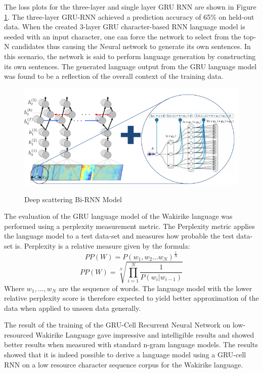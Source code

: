 The loss plots for the three-layer and single layer GRU RNN are shown in Figure \ref{fig_ch7_00losses}.  The three-layer GRU-RNN achieved a prediction accuracy of 65\% on held-out data.  When the created 3-layer GRU character-based RNN language model is seeded with an input character, one can force the network to select from the top-N candidates thus causing the Neural network to generate its own sentences.  In this scenario, the network is said to perform language generation by constructing its own sentences.  The generated language output from the GRU language model was found to be a reflection of the overall context of the training data. 

\begin{figure}
\centering
  \includegraphics[width=14cm]{thesis/images/ctc_scatter.png}\\
  \caption{Deep scattering Bi-RNN Model} \label{fig_ch7_00losses}
\end{figure}

The evaluation of the GRU language model of the Wakirike language was performed using a perplexity measurement metric. The Perplexity metric applies the language model to a test data-set and measures how probable the test data-set is. Perplexity is a relative measure given by the formula:
%
\begin{equation}
PP(W)=P(w_1,w_2\dots w_N)^\frac{1}{N}
\label{ch5_eq1_ppx}
\end{equation}
%
%
\begin{equation}
PP(W)=\sqrt[N]{\prod_{i=1}^N\frac{1}{P(w_i|w_{i-1})}}
\label{ch5_eq2_ppx}
\end{equation}
%
Where $w_1,\dots,w_N$ are the sequence of words. The language model with the lower relative perplexity score is therefore expected to yield better approximation of the data when applied to unseen data generally.

The result of the training of the GRU-Cell Recurrent Neural Network on low-resourced Wakirike Language gave impressive and intelligible results and showed better results when measured with standard n-gram language models. The results showed that it is indeed possible to derive a language model using a GRU-cell RNN on a low resource character sequence corpus for the Wakirike language.

